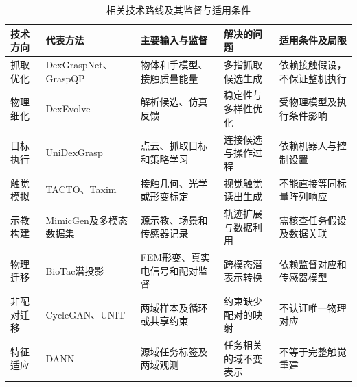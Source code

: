 \begin{table}[htbp]
  \centering
  \caption{相关技术路线及其监督与适用条件}
  \label{tab:related_work_routes}
  \begingroup
  \setlength{\tabcolsep}{3pt}
  \begin{tabularx}{\textwidth}{p{}p{}XXX}
    \toprule
    技术方向 & 代表方法 & 主要输入与监督 & 解决的问题 & 适用条件及局限 \\
    \midrule
    抓取优化 & DexGraspNet、GraspQP & 物体和手模型、接触质量能量 & 多指抓取候选生成 & 依赖接触假设，不保证整机执行 \\
    物理细化 & DexEvolve & 解析候选、仿真反馈 & 稳定性与多样性优化 & 受物理模型及执行条件影响 \\
    目标执行 & UniDexGrasp & 点云、抓取目标和策略学习 & 连接候选与操作过程 & 依赖机器人与控制设置 \\
    触觉模拟 & TACTO、Taxim & 接触几何、光学或形变标定 & 视觉触觉读出生成 & 不能直接等同标量阵列响应 \\
    示教构建 & MimicGen及多模态数据集 & 源示教、场景和传感器记录 & 轨迹扩展与数据利用 & 需核查任务假设及数据关联 \\
    物理迁移 & BioTac潜投影\cite{narang2021latentprojections} & FEM形变、真实电信号和配对监督 & 跨模态潜表示转换 & 依赖监督对应和传感器模型 \\
    非配对迁移 & CycleGAN、UNIT & 两域样本及循环或共享约束 & 约束缺少配对的映射 & 不认证唯一物理对应 \\
    特征适应 & DANN & 源域任务标签及两域观测 & 任务相关的域不变表示 & 不等于完整触觉重建 \\
    \bottomrule
  \end{tabularx}
  \endgroup
\end{table}
